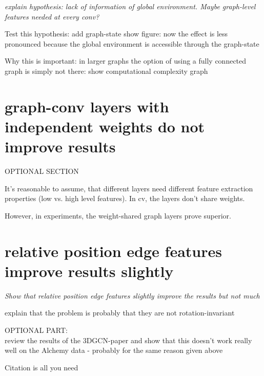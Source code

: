 {\itshape
explain hypothesis:
lack of information of global environment. Maybe graph-level features needed at every conv?

Test this hypothesis:
add graph-state
show figure: now the effect is less pronounced because the global environment is accessible through the graph-state

Why this is important:
in larger graphs the option of using a fully connected graph is simply not there:
show computational complexity graph
}


\section{graph-conv layers with independent weights do not improve results}

{\itshape
	
OPTIONAL SECTION

It's reasonable to assume, that different layers need different feature extraction properties (low vs. high level features). In cv, the layers don't share weights.

However, in experiments, the weight-shared graph layers prove superior.
}

\section{relative position edge features improve results slightly}

{\itshape
 Show that relative position edge features slightly improve the results but not much
 
 explain that the problem is probably that they are not rotation-invariant
	
	
OPTIONAL PART:\\
review the results of the 3DGCN-paper and show that this doesn't work really well on the Alchemy data - probably for the same reason given above
}

Citation is all you need~\cite{Vaswani2017}





